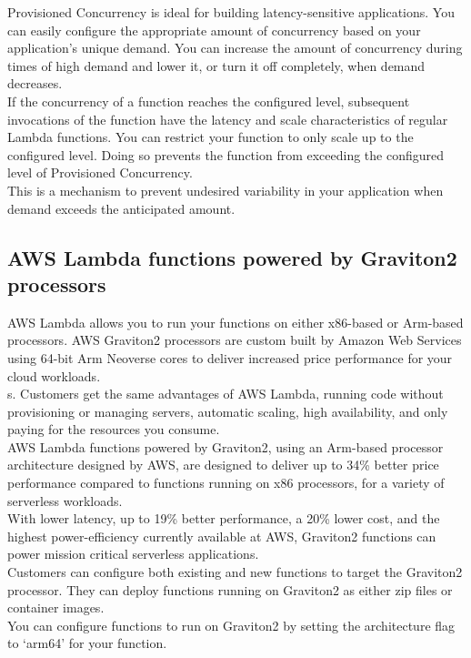 \documentclass[12pt, letterpaper, twoside]{article}
\begin{document}
Provisioned Concurrency is ideal for building latency-sensitive applications. You can easily configure the appropriate amount of 
concurrency based on your application's unique demand. You can increase the amount of concurrency during times of high demand and 
lower it, or turn it off completely, when demand decreases.\\

If the concurrency of a function reaches the configured level, subsequent invocations of the function have the latency and scale 
characteristics of regular Lambda functions. You can restrict your function to only scale up to the configured level. Doing so 
prevents the function from exceeding the configured level of Provisioned Concurrency.\\
This is a mechanism to prevent undesired variability in your application when demand exceeds the anticipated amount.\\

\subsection{AWS Lambda functions powered by Graviton2 processors}
AWS Lambda allows you to run your functions on either x86-based or Arm-based processors. AWS Graviton2 processors are custom 
built by Amazon Web Services using 64-bit Arm Neoverse cores to deliver increased price performance for your cloud workloads.\\
s. Customers get the same advantages of AWS Lambda, running code without provisioning or managing servers, automatic scaling, 
high availability, and only paying for the resources you consume.\\

AWS Lambda functions powered by Graviton2, using an Arm-based processor architecture designed by AWS, are designed to 
deliver up to 34\% better price performance compared to functions running on x86 processors, for a variety of serverless 
workloads.\\
With lower latency, up to 19\% better performance, a 20\% lower cost, and the highest power-efficiency currently available 
at AWS, Graviton2 functions can power mission critical serverless applications.\\
Customers can configure both existing and new functions to target the Graviton2 processor. They can deploy functions 
running on Graviton2 as either zip files or container images.\\

You can configure functions to run on Graviton2 by setting the architecture flag to ‘arm64’ for your function.\\
\end{document}
